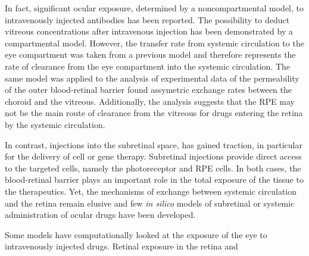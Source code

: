 \documentclass[12pt,a4paper]{journal}
\begin{document}
In fact, significant ocular exposure, determined by a noncompartmental model, to intravenously injected antibodies has been reported.\cite{Shivva_2021}
The possibility to deduct vitreous concentrations after intravenous injection has been demonstrated by a compartmental model.\cite{Vellonen_2015}
However, the transfer rate from systemic circulation to the eye compartment was taken from a previous model and therefore represents the rate of clearance from the eye compartment into the systemic circulation.
The same model was applied to the analysis of experimental data of the permeability of the outer blood-retinal barrier found assymetric exchange rates between the choroid and the vitreous.\cite{Ramsay_2019}
Additionally, the analysis suggests that the RPE may not be the main route of clearance from the vitreous for drugs entering the retina by the systemic circulation.\cite{Ramsay_2019}


In contrast, injections into the subretinal space, has gained traction, in particular for the delivery of cell or gene therapy.
Subretinal injections provide direct access to the targeted cells, namely the photoreceptor and RPE cells.
In both cases, the blood-retinal barrier plays an important role in the total exposure of the tissue to the therapeutics.
Yet, the mechanisms of exchange between systemic circulation and the retina remain elusive and few \textit{in silico} models of subretinal or systemic administration of ocular drugs have been developed.


Some models have computationally looked at the exposure of the eye to intravenously injected drugs.\cite{Shivva_2021,Vellonen_2015}
Retinal exposure in the retina and 




\end{document}
